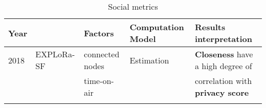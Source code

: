 \onecolumn
\setlength{\hoffset}{-.5in}
\pagestyle{empty}

\begin{longtable}{lllll}
	Year  & \                                              & \textbf{Factors}                 & \textbf{Computation Model}       & \textbf{Results interpretation}                               \\\hline
	2018  & EXPLoRa-SF \cite{cuomo_explora_2017}           & connected nodes            & Estimation                       & \textbf{Closeness} have a high degree of                      \\
	\     &                                                & time-on-air               &                                  & correlation with \textbf{privacy score}                       \\\hline

\caption{Social metrics}
\end{longtable}

\setlength{\hoffset}{-0in}
\twocolumn